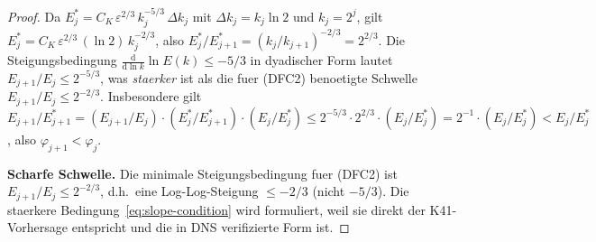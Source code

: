 \documentclass[12pt,a4paper]{article}
\theoremstyle{definition}
\theoremstyle{plain}
\theoremstyle{remark}
\begin{document}
\begin{proof}
Da $E_j^* = C_K\,\varepsilon^{2/3}\,k_j^{-5/3}\,\Delta k_j$ mit
$\Delta k_j = k_j \ln 2$ und $k_j = 2^j$, gilt
$E_j^* = C_K\,\varepsilon^{2/3}\,(\ln 2)\,k_j^{-2/3}$, also
$E_j^*/E_{j+1}^* = (k_j/k_{j+1})^{-2/3} = 2^{2/3}$. Die
Steigungsbedingung $\frac{\mathrm{d}}{\mathrm{d}\ln k}\ln E(k) \le -5/3$
in dyadischer Form lautet $E_{j+1}/E_j \le 2^{-5/3}$, was
\emph{staerker} ist als die fuer (DFC2) benoetigte Schwelle
$E_{j+1}/E_j \le 2^{-2/3}$. Insbesondere gilt
$E_{j+1}/E_{j+1}^* = (E_{j+1}/E_j)\cdot(E_j^*/E_{j+1}^*)\cdot(E_j/E_j^*)
\le 2^{-5/3}\cdot 2^{2/3}\cdot(E_j/E_j^*) = 2^{-1}\cdot(E_j/E_j^*)
< E_j/E_j^*$, also $\varphi_{j+1} < \varphi_j$.

\smallskip\noindent
\textbf{Scharfe Schwelle.}\;
Die minimale Steigungsbedingung fuer (DFC2) ist $E_{j+1}/E_j \le 2^{-2/3}$,
d.h.\ eine Log-Log-Steigung $\le -2/3$ (nicht $-5/3$). Die staerkere
Bedingung~\eqref{eq:slope-condition} wird formuliert, weil sie direkt
der K41-Vorhersage entspricht und die in DNS verifizierte Form ist.
\end{proof}
\end{document}
